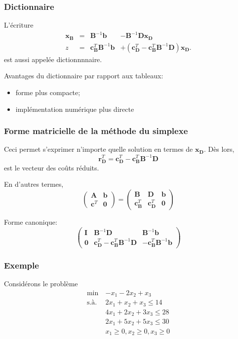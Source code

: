 \documentclass[usepdftitle=false]{beamer}
\def\bb{\boldsymbol{b}}
\def\bc{\boldsymbol{c}}
\def\br{\boldsymbol{r}}
\def\bx{\boldsymbol{x}}
\def\bA{\boldsymbol{A}}
\def\bB{\boldsymbol{B}}
\def\bD{\boldsymbol{D}}
\def\bI{\boldsymbol{I}}
\def\bzero{\boldsymbol{0}}
\begin{document}
\begin{frame}
\frametitle{Dictionnaire}

L'écriture
$$
\begin{matrix}
  \bx_{\bB} & = & \bB^{-1} \bb & - \bB^{-1}\bD\bx_{\bD} \\
\hline
z & = & \bc_{\bB}^T \bB^{-1} \bb & + \left( \bc_{\bD}^T - \bc_{\bB}^T \bB^{-1} \bD \right) \bx_{\bD}. 
\end{matrix}
$$
est aussi appelée {\color{red} dictionnnnaire}.

\mbox{}

Avantages du dictionnaire par rapport aux tableaux:
\begin{itemize}
	\item forme plus compacte;
	\item implémentation numérique plus directe
\end{itemize}

\end{frame}

\begin{frame}
\frametitle{Forme matricielle de la méthode du simplexe}

Ceci permet s'exprimer n'importe quelle solution en termes de $\bx_{\bD}$. Dès lors,
\[
\br_{\bD}^T = \bc_{\bD}^T - \bc_{\bB}^T \bB^{-1} \bD
\]
est le vecteur des coûts réduits.

\mbox{}

En d'autres termes,
\[
\begin{pmatrix}
\bA & \bb \\
\bc^T & \bzero
\end{pmatrix}
=
\begin{pmatrix}
\bB & \bD & \bb \\
\bc_{\bB}^T & \bc_{\bD}^T & \bzero
\end{pmatrix}
\]

\mbox{}

Forme canonique: %
\[
\begin{pmatrix}
\bI & \bB^{-1}\bD & \bB^{-1}\bb \\
\bzero & \bc_{\bD}^T - \bc_{\bB}^T \bB^{-1} \bD
& -\bc_{\bB}^T \bB^{-1} \bb
\end{pmatrix}
\]
\end{frame}

\begin{frame}
\frametitle{Exemple}

Considérons le problème
\begin{align*}
\min\ & - x_1 - 2x_2 + x_3 \\
\mbox{s.à. } & 2x_1 + x_2 + x_3 \leq 14 \\
& 4x_1 + 2x_2 + 3x_3 \leq 28 \\
& 2x_1 + 5x_2 + 5x_3 \leq 30 \\
& x_1 \geq 0, x_2 \geq 0, x_3 \geq 0
\end{align*}

\end{frame}
\end{document}
